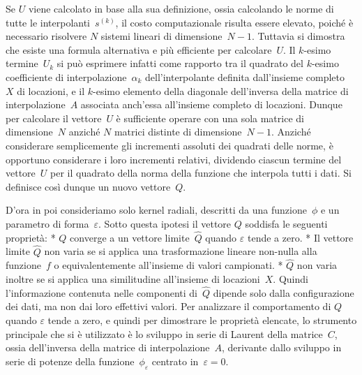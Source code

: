 Se $U$ viene calcolato in base alla sua definizione, ossia calcolando le norme di tutte le interpolanti~$s^{(k)}$, il costo computazionale risulta essere elevato, poiché è necessario risolvere $N$ sistemi lineari di dimensione~$N{-}1$.
Tuttavia si dimostra che esiste una formula alternativa e più efficiente per calcolare~$U$.  Il $k$-esimo termine~$U_k$ si può esprimere infatti come rapporto tra il quadrato del $k$-esimo coefficiente di interpolazione~$\alpha_k$ dell’interpolante definita dall’insieme completo~$X$ di locazioni, e il $k$-esimo elemento della diagonale dell’inversa della matrice di interpolazione~$A$ associata anch’essa all’insieme completo di locazioni.  Dunque per calcolare il vettore~$U$ è sufficiente operare con una sola matrice di dimensione~$N$ anziché $N$ matrici distinte di dimensione~$N{-}1$. 
Anziché considerare semplicemente gli incrementi assoluti dei quadrati delle norme, è opportuno considerare i loro incrementi relativi, dividendo ciascun termine del vettore~$U$ per il quadrato della norma della funzione che interpola tutti i dati.  Si definisce così dunque un nuovo vettore~$Q$.


D’ora in poi consideriamo solo kernel radiali, descritti da una funzione~$\phi$ e un parametro di forma~$\varepsilon$.
 Sotto questa ipotesi il  vettore $Q$  soddisfa le seguenti proprietà:
\begitems
* $Q$ converge a un vettore limite~$\hat Q$ quando $\varepsilon$ tende a zero.
* Il vettore limite $\hat Q$ non varia se si applica una trasformazione lineare non-nulla alla funzione~$f$ o equivalentemente all’insieme di valori campionati.
* $\hat Q$ non varia inoltre se si applica una similitudine all’insieme di locazioni~$X$.
\enditems
Quindi l’informazione contenuta nelle componenti di~$\hat Q$ dipende solo dalla configurazione dei dati, ma non dai loro effettivi valori.
Per analizzare il comportamento di $Q$ quando $\varepsilon$ tende a zero, e quindi per dimostrare le proprietà elencate, lo strumento principale che si è utilizzato è lo sviluppo in serie di Laurent della matrice~$C$, ossia dell’inversa della matrice di interpolazione~$A$, derivante dallo sviluppo in serie di potenze della funzione~$\phi_\varepsilon$ centrato in~$\varepsilon = 0$.


